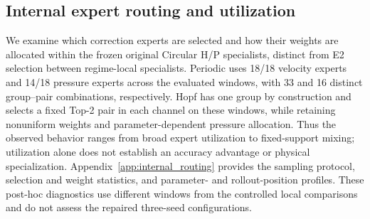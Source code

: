 \subsection{Internal expert routing and utilization}
\label{sec:exp_diagnostics}

We examine which correction experts are selected and how their weights
are allocated within the frozen original Circular H/P specialists,
distinct from E2 selection between regime-local specialists.
Periodic uses 18/18 velocity experts and 14/18 pressure experts across
the evaluated windows, with 33 and 16 distinct group--pair combinations,
respectively. Hopf has one group by construction and selects a fixed
Top-2 pair in each channel on these windows, while retaining nonuniform
weights and parameter-dependent pressure allocation.
Thus the observed behavior ranges from broad expert utilization to
fixed-support mixing; utilization alone does not establish an accuracy
advantage or physical specialization.
Appendix~\ref{app:internal_routing} provides the sampling protocol,
selection and weight statistics, and parameter- and rollout-position
profiles. These post-hoc diagnostics use different windows from the
controlled local comparisons and do not assess the repaired three-seed
configurations.
